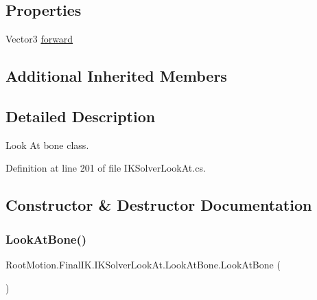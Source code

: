 \subsection*{Properties}
\begin{DoxyCompactItemize}
\item 
Vector3 \mbox{\hyperlink{class_root_motion_1_1_final_i_k_1_1_i_k_solver_look_at_1_1_look_at_bone_a02592cd359f8a8bdc1b6971085fd84d0}{forward}}
\end{DoxyCompactItemize}
\subsection*{Additional Inherited Members}


\subsection{Detailed Description}
Look At bone class. 



Definition at line 201 of file I\+K\+Solver\+Look\+At.\+cs.



\subsection{Constructor \& Destructor Documentation}
\mbox{\label{class_root_motion_1_1_final_i_k_1_1_i_k_solver_look_at_1_1_look_at_bone_a6b55586e3fc6a2410e14157395707f92}} 
\subsubsection{\texorpdfstring{Look\+At\+Bone()}{LookAtBone()}\hspace{0.1cm}{\footnotesize\ttfamily [1/2]}}
{\footnotesize\ttfamily Root\+Motion.\+Final\+I\+K.\+I\+K\+Solver\+Look\+At.\+Look\+At\+Bone.\+Look\+At\+Bone (\begin{DoxyParamCaption}{ }\end{DoxyParamCaption})}



